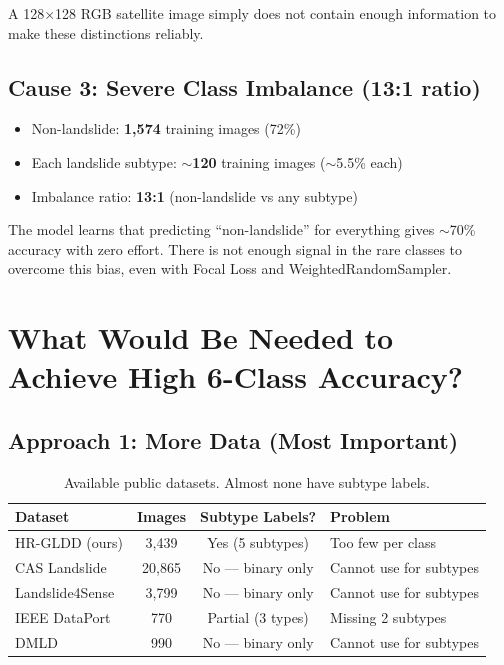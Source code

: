 \documentclass[12pt,a4paper]{article}
\begin{document}
A 128$\times$128 RGB satellite image simply does not contain enough information to make these distinctions reliably.

\subsection{Cause 3: Severe Class Imbalance (13:1 ratio)}

\begin{itemize}
    \item Non-landslide: \textbf{1,574} training images (72\%)
    \item Each landslide subtype: \textbf{$\sim$120} training images ($\sim$5.5\% each)
    \item Imbalance ratio: \textbf{13:1} (non-landslide vs any subtype)
\end{itemize}

The model learns that predicting ``non-landslide'' for everything gives $\sim$70\% accuracy with zero effort. There is not enough signal in the rare classes to overcome this bias, even with Focal Loss and WeightedRandomSampler.

\section{What Would Be Needed to Achieve High 6-Class Accuracy?}

\subsection{Approach 1: More Data (Most Important)}

\begin{table}[h]
    \centering
    \renewcommand{\arraystretch}{1.2}
    \begin{tabular}{lccl}
        \toprule
        \textbf{Dataset} & \textbf{Images} & \textbf{Subtype Labels?} & \textbf{Problem} \\
        \midrule
        HR-GLDD (ours) & 3,439 & Yes (5 subtypes) & Too few per class \\
        CAS Landslide & 20,865 & No --- binary only & Cannot use for subtypes \\
        Landslide4Sense & 3,799 & No --- binary only & Cannot use for subtypes \\
        IEEE DataPort & 770 & Partial (3 types) & Missing 2 subtypes \\
        DMLD & 990 & No --- binary only & Cannot use for subtypes \\
        \bottomrule
    \end{tabular}
    \caption{Available public datasets. Almost none have subtype labels.}
\end{table}
\end{document}
